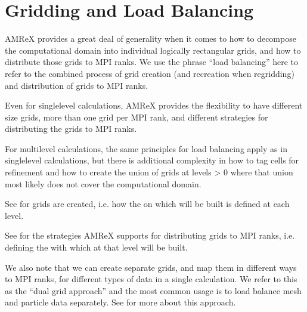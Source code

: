 \documentclass[letterpaper,10pt,english]{sphinxmanual}
\begin{document}
\chapter{Gridding and Load Balancing}
\label{\detokenize{ManagingGridHierarchy_Chapter:gridding-and-load-balancing}}\label{\detokenize{ManagingGridHierarchy_Chapter:chap-managinggridhierarchy}}\label{\detokenize{ManagingGridHierarchy_Chapter::doc}}
\sphinxAtStartPar
AMReX provides a great deal of generality when it comes to how to decompose the
computational domain into individual logically rectangular grids, and how to distribute
those grids to MPI ranks.  We use the phrase “load balancing” here to refer to the combined process
of grid creation (and re\sphinxhyphen{}creation when regridding) and distribution of grids to MPI ranks.

\sphinxAtStartPar
Even for single\sphinxhyphen{}level calculations, AMReX provides the flexibility to have different size grids,
more than one grid per MPI rank, and different strategies for distributing the grids to MPI ranks.

\sphinxAtStartPar
For multi\sphinxhyphen{}level calculations, the same principles for load balancing apply as in single\sphinxhyphen{}level calculations,
but there is additional complexity in how to tag cells for refinement and how to create the
union of grids at levels \textgreater{} 0 where that union most likely does not cover the computational domain.

\sphinxAtStartPar
See {\hyperref[\detokenize{GridCreation:sec-grid-creation}]{}} for grids are created, i.e. how the  on which
 will be built is defined at each level.

\sphinxAtStartPar
See {\hyperref[\detokenize{LoadBalancing:sec-load-balancing}]{}} for the strategies AMReX supports for distributing
grids to MPI ranks, i.e. defining the  with which
 at that level will be built.

\sphinxAtStartPar
We also note that we can create separate grids, and map them in different ways to MPI ranks, for
different types of data in a single calculation.  We refer to this as the “dual grid approach”
and the most common usage is to load balance mesh and particle data separately. See {\hyperref[\detokenize{DualGrid:sec-dual-grid}]{}}
for more about this approach.
\end{document}
